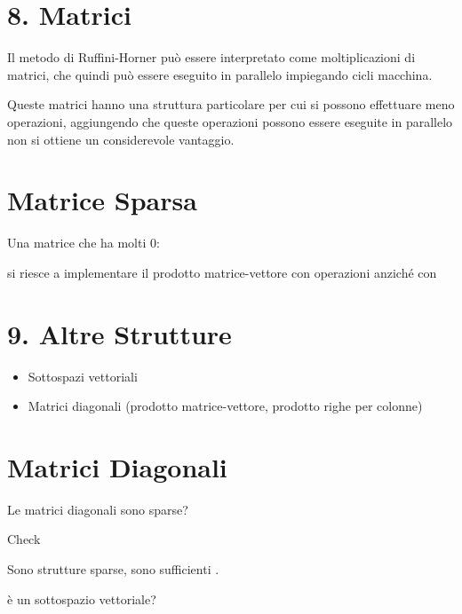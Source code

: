 \documentclass[
]{article}
\providecommand{\tightlist}{%
  \setlength{\itemsep}{0pt}\setlength{\parskip}{0pt}}
\begin{document}
\hypertarget{matrici}{%
\section{8. Matrici}\label{matrici}}

Il metodo di Ruffini-Horner può essere interpretato come moltiplicazioni
di matrici, che quindi può essere eseguito in parallelo impiegando {}
cicli macchina.

Queste matrici hanno una struttura particolare per cui si possono
effettuare meno operazioni, aggiungendo che queste operazioni possono
essere eseguite in parallelo non si ottiene un considerevole vantaggio.

\hypertarget{matrice-sparsa}{%
\section{Matrice Sparsa}\label{matrice-sparsa}}

Una matrice che ha molti 0:

{}

{}

si riesce a implementare il prodotto matrice-vettore con {} operazioni
anziché con {}

\hypertarget{altre-strutture}{%
\section{9. Altre Strutture}\label{altre-strutture}}

\begin{itemize}
\tightlist
\item
  Sottospazi vettoriali
\item
  Matrici diagonali (prodotto matrice-vettore, prodotto righe per
  colonne)
\end{itemize}

\hypertarget{matrici-diagonali}{%
\section{Matrici Diagonali}\label{matrici-diagonali}}

{}

Le matrici diagonali sono sparse?

{}

{}

Check

Sono strutture sparse, sono sufficienti {}.

è un sottospazio vettoriale?
\end{document}
